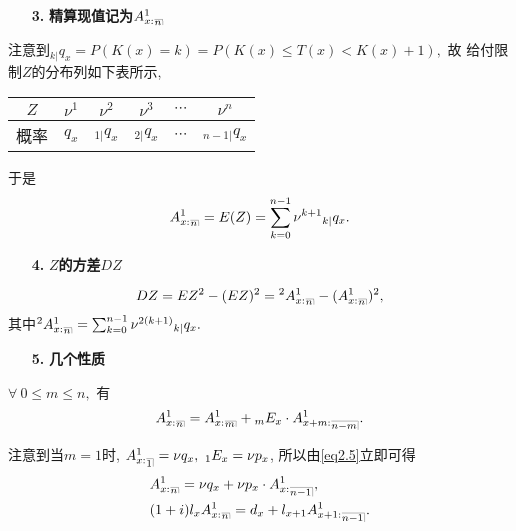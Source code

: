 \documentclass[a4paper,openany, 10pt]{ctexbook}
\makeatletter
\newcommand{\hei}{\CJKfamily{hei}}      %
\def\no{\nonumber}
\DeclareRobustCommand{\annu}[1]{_{%
    \def\arraystretch{0}%
    \setlength\arraycolsep{1pt}%
    \setlength\arrayrulewidth{.2pt}%
    \begin{array}[b]{@{}c|}\hline
        \\[\arraycolsep]%
        \scriptstyle #1%
    \end{array}%
}}
\makeatother
\begin{document}
\begin{itemize}
    \item[{\bf\hei 3.}]{\bf\hei 精算现值记为$A_{x:}^1{}_{\annu{n}}$}
\end{itemize}
注意到${}_{k|}q_x= P(K(x)=k)= P(K(x)\leq T(x) < K(x)+1),$ 故
给付限制$Z$的分布列如下表所示,
\begin{center}
    \begin{tabular}{ c|c|c|c|c|c }
        \hline
        $Z$ & $\nu^1$ & $\nu^2$      & $\nu^3$      & $\cdots$ & $\nu^n$        \\
        \hline
        概率  & $q_x$ & $_{1|}q_x$ & $_{2|}q_x$ & $\cdots$ & $_{n-1|}q_x$ \\
        \hline
    \end{tabular}
\end{center}
 于是$$A_{x:}^1{}_{\annu{n}} = E(Z) = \sum_{k=0}^{n-1}\nu^{k+1}{}_{k|}q_x.$$

\begin{itemize}
    \item[{\bf\hei 4.}]{\bf\hei $Z$的方差$DZ$}
\end{itemize}
$$DZ =EZ^2-(EZ)^2= {}^2A_{x:}^1{}_{\annu{n}} - (A_{x:}^1{}_{\annu{n}})^2,$$
其中${}^2A_{x:}^1{}_{\annu{n}} = \sum_{k=0}^{n-1}\nu^{2(k+1)}{}_{k|}q_x.$

\begin{itemize}
    \item [{\bf\hei 5.}] {\bf\hei 几个性质}
\end{itemize}
\begin{proposition}$\forall~0\leq m\leq n,$ 有
  \begin{align}\label{eq2.5}
    A_{x:}^1{}_{\annu{n}}=A_{x:}^1{}_{\annu m}+{}_mE_x\cdot A_{x+m:}^1{}_{\annu {n-m}}.
\end{align}
\end{proposition}
注意到当$m=1$时, $A_{x:}^1{}_{\annu{1}} = \nu q_x,~{}_1E_x = \nu p_x$, 所以由\eqref{eq2.5}立即可得
    \begin{align}
    &A_{x:}^1{}_{\annu{n}}=\nu q_x+\nu p_x\cdot A_{x:}^1{}_{\annu{n-1}},\no\\
&(1+i)l_x A_{x:}^1{}_{\annu{n}} = d_x + l_{x+1} A_{x+1:}^1{}_{\annu{n-1}}.\no
\end{align}
\end{document}
